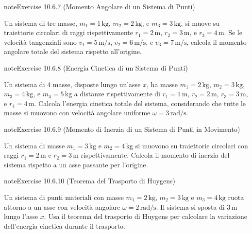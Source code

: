\documentclass[letterpaper,10pt,italian]{jupyterBook}
\begin{document}
\begin{sphinxadmonition}{note}{Exercise 10.6.7 (Momento Angolare di un Sistema di Punti)}



\sphinxAtStartPar
Un sistema di tre masse, \(m_1 = 1 \, \text{kg}\), \(m_2 = 2 \, \text{kg}\), e \(m_3 = 3 \, \text{kg}\), si muove su traiettorie circolari di raggi rispettivamente \(r_1 = 2 \, \text{m}\), \(r_2 = 3 \, \text{m}\), e \(r_3 = 4 \, \text{m}\). Se le velocità tangenziali sono \(v_1 = 5 \, \text{m/s}\), \(v_2 = 6 \, \text{m/s}\), e \(v_3 = 7 \, \text{m/s}\), calcola il momento angolare totale del sistema rispetto all’origine.
\end{sphinxadmonition}
 \label{exercise:ch/mechanics/inertia-problems-exercise-7}

\begin{sphinxadmonition}{note}{Exercise 10.6.8 (Energia Cinetica di un Sistema di Punti)}



\sphinxAtStartPar
Un sistema di 4 masse, disposte lungo un’asse \(x\), ha masse \(m_1 = 2 \, \text{kg}\), \(m_2 = 3 \, \text{kg}\), \(m_3 = 4 \, \text{kg}\), e \(m_4 = 5 \, \text{kg}\) a distanze rispettivamente di \(r_1 = 1 \, \text{m}\), \(r_2 = 2 \, \text{m}\), \(r_3 = 3 \, \text{m}\), e \(r_4 = 4 \, \text{m}\). Calcola l’energia cinetica totale del sistema, considerando che tutte le masse si muovono con velocità angolare uniforme \(\omega = 3 \, \text{rad/s}\).
\end{sphinxadmonition}
 \label{exercise:ch/mechanics/inertia-problems-exercise-8}

\begin{sphinxadmonition}{note}{Exercise 10.6.9 (Momento di Inerzia di un Sistema di Punti in Movimento)}



\sphinxAtStartPar
Un sistema di masse \(m_1 = 3 \, \text{kg}\) e \(m_2 = 4 \, \text{kg}\) si muovono su traiettorie circolari con raggi \(r_1 = 2 \, \text{m}\) e \(r_2 = 3 \, \text{m}\) rispettivamente. Calcola il momento di inerzia del sistema rispetto a un asse passante per l’origine.
\end{sphinxadmonition}
 \label{exercise:ch/mechanics/inertia-problems-exercise-9}

\begin{sphinxadmonition}{note}{Exercise 10.6.10 (Teorema del Trasporto di Huygens)}



\sphinxAtStartPar
Un sistema di punti materiali con masse \(m_1 = 2 \, \text{kg}\), \(m_2 = 3 \, \text{kg}\) e \(m_3 = 4 \, \text{kg}\) ruota attorno a un asse con velocità angolare \(\omega = 2 \, \text{rad/s}\). Il sistema si sposta di \(3 \, \text{m}\) lungo l’asse \(x\). Usa il teorema del trasporto di Huygens per calcolare la variazione dell’energia cinetica durante il trasporto.
\end{sphinxadmonition}
\end{document}
